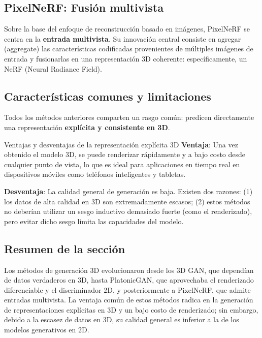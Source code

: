 \subsection{PixelNeRF: Fusión multivista}

Sobre la base del enfoque de reconstrucción basado en imágenes, PixelNeRF se centra en la \textbf{entrada multivista}. Su innovación central consiste en agregar (aggregate) las características codificadas provenientes de múltiples imágenes de entrada y fusionarlas en una representación 3D coherente: específicamente, un NeRF (Neural Radiance Field).

\subsection{Características comunes y limitaciones}

Todos los métodos anteriores comparten un rasgo común: predicen directamente una representación \textbf{explícita y consistente en 3D}.

\begin{importantbox}{Ventajas y desventajas de la representación explícita 3D}
\textbf{Ventaja}: Una vez obtenido el modelo 3D, se puede renderizar rápidamente y a bajo costo desde cualquier punto de vista, lo que es ideal para aplicaciones en tiempo real en dispositivos móviles como teléfonos inteligentes y tabletas.

\textbf{Desventaja}: La calidad general de generación es baja. Existen dos razones: (1) los datos de alta calidad en 3D son extremadamente escasos; (2) estos métodos no deberían utilizar un sesgo inductivo demasiado fuerte (como el renderizado), pero evitar dicho sesgo limita las capacidades del modelo.
\end{importantbox}

\subsection{Resumen de la sección}

Los métodos de generación 3D evolucionaron desde los 3D GAN, que dependían de datos verdaderos en 3D, hasta PlatonicGAN, que aprovechaba el renderizado diferenciable y el discriminador 2D, y posteriormente a PixelNeRF, que admite entradas multivista. La ventaja común de estos métodos radica en la generación de representaciones explícitas en 3D y un bajo costo de renderizado; sin embargo, debido a la escasez de datos en 3D, su calidad general es inferior a la de los modelos generativos en 2D.
